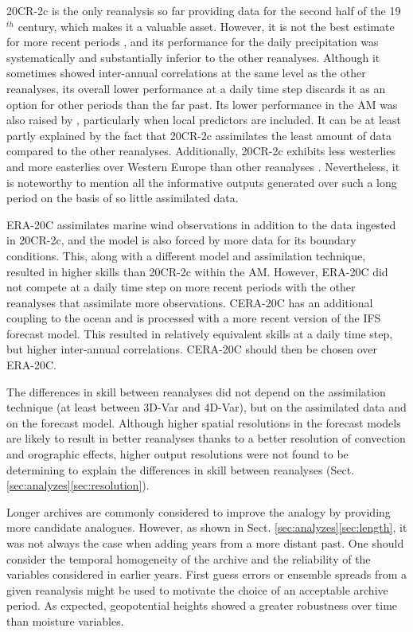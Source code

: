 \documentclass{ametsoc}
\begin{document}
20CR-2c is the only reanalysis so far providing data for the second half of the 19$^{th}$ century, which makes it a valuable asset. However, it is not the best estimate for more recent periods \citep{Poli2017}, and its performance for the daily precipitation was systematically and substantially inferior to the other reanalyses. Although it sometimes showed inter-annual correlations at the same level as the other reanalyses, its overall lower performance at a daily time step discards it as an option for other periods than the far past. Its lower performance in the AM was also raised by \citet[][]{Dayon2015}, particularly when local predictors are included. It can be at least partly explained by the fact that 20CR-2c assimilates the least amount of data compared to the other reanalyses. Additionally, 20CR-2c exhibits less westerlies and more easterlies over Western Europe than other reanalyses \citep{Rohrer2018}. Nevertheless, it is noteworthy to mention all the informative outputs generated over such a long period on the basis of so little assimilated data.

ERA-20C assimilates marine wind observations in addition to the data ingested in 20CR-2c, and the model is also forced by more data for its boundary conditions. This, along with a different model and assimilation technique, resulted in higher skills than 20CR-2c within the AM. However, ERA-20C did not compete at a daily time step on more recent periods with the other reanalyses that assimilate more observations. CERA-20C has an additional coupling to the ocean and is processed with a more recent version of the IFS forecast model. This resulted in relatively equivalent skills at a daily time step, but higher inter-annual correlations. CERA-20C should then be chosen over ERA-20C.

The differences in skill between reanalyses did not depend on the assimilation technique (at least between 3D-Var and 4D-Var), but on the assimilated data and on the forecast model. Although higher spatial resolutions in the forecast models are likely to result in better reanalyses thanks to a better resolution of convection and orographic effects, higher output resolutions were not found to be determining to explain the differences in skill between reanalyses (Sect. \ref{sec:analyzes}\ref{sec:resolution}). 

Longer archives are commonly considered to improve the analogy by providing more candidate analogues. However, as shown in Sect. \ref{sec:analyzes}\ref{sec:length}, it was not always the case when adding years from a more distant past. One should consider the temporal homogeneity of the archive and the reliability of the variables considered in earlier years. First guess errors or ensemble spreads from a given reanalysis might be used to motivate the choice of an acceptable archive period. As expected, geopotential heights showed a greater robustness over time than moisture variables. 
\end{document}
